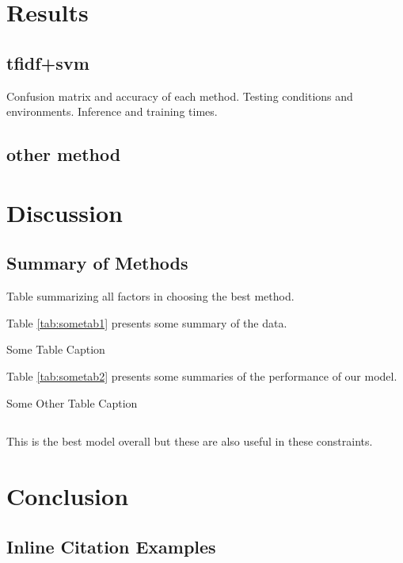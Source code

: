 \documentclass[12pt,letterpaper]{article}
\begin{document}
\section{Results}
\subsection{tfidf+svm}
Confusion matrix and accuracy of each method. Testing conditions and environments. Inference and training times.
\subsection{other method}

\section{Discussion}
\subsection{Summary of Methods}
Table summarizing all factors in choosing the best method.

Table \ref{tab:sometab1} presents some summary of the data.

\begin{table}[htbp]
\caption{Some Table Caption}
\label{tab:sometab1}
\resizebox{0.4\linewidth}{!}{}
\end{table}

Table \ref{tab:sometab2} presents some summaries of the performance of our model.

\begin{table}[htbp]
\caption{Some Other Table Caption}
\label{tab:sometab2}
\resizebox{0.9\linewidth}{!}{}
\end{table}

\subsection{}
This is the best model overall
but these are also useful in these constraints.

\section{Conclusion}

\subsection{Inline Citation Examples}
\end{document}
